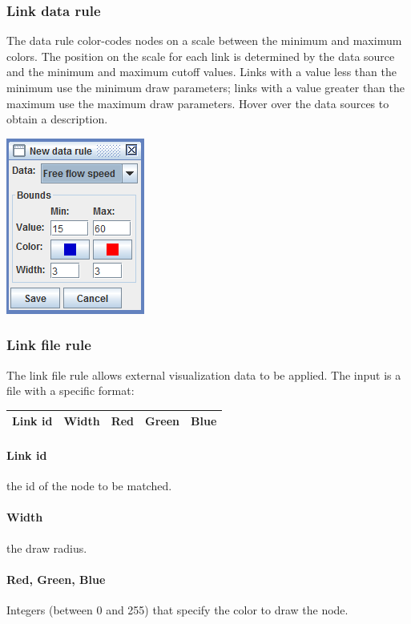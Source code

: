 \subsubsection{Link data rule}

The data rule color-codes nodes on a scale between the minimum and maximum colors. The position on the scale for each link is determined by the data source and the minimum and maximum cutoff values. Links with a value less than the minimum use the minimum draw parameters; links with a value greater than the maximum use the maximum draw parameters. Hover over the data sources to obtain a description.

\begin{center}
\includegraphics[scale=1]{images/editor6d.png}
\end{center}

\subsubsection{Link file rule}
The link file rule allows external visualization data to be applied. The input is a file with a specific format:
\begin{center}
\begin{tabular}{ccccc}
\hline
Link id & Width & Red & Green & Blue\\\hline
\end{tabular}
\end{center}
\paragraph*{Link id}
the id of the node to be matched.

\paragraph*{Width} the draw radius.

\paragraph*{Red, Green, Blue} Integers (between 0 and 255) that specify the color to draw the node.


